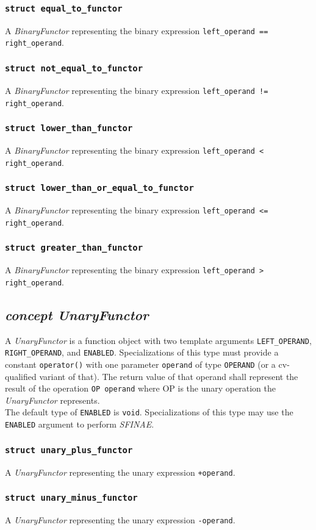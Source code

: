 \documentclass[oneside]{article}
\begin{document}
\subsubsection{\texttt{struct equal\_to\_functor}}
A \textit{BinaryFunctor} representing the binary expression \verb|left_operand == right_operand|.

\subsubsection{\texttt{struct not\_equal\_to\_functor}}
A \textit{BinaryFunctor} representing the binary expression \verb|left_operand != right_operand|.

\subsubsection{\texttt{struct lower\_than\_functor}}
A \textit{BinaryFunctor} representing the binary expression \verb|left_operand < right_operand|.

\subsubsection{\texttt{struct lower\_than\_or\_equal\_to\_functor}}
A \textit{BinaryFunctor} representing the binary expression \verb|left_operand <= right_operand|.

\subsubsection{\texttt{struct greater\_than\_functor}}
A \textit{BinaryFunctor} representing the binary expression \verb|left_operand > right_operand|.

\subsection{\textit{concept UnaryFunctor}}
A \textit{UnaryFunctor} is a function object with two template arguments \verb+LEFT_OPERAND+,
\verb+RIGHT_OPERAND+, and \verb+ENABLED+. Specializations of this type must provide a
constant \verb+operator()+ with one parameter \verb+operand+ of type \verb+OPERAND+
(or a cv-qualified variant of that). The return value of that operand shall represent the
result of the operation \verb+OP operand+ where OP is the unary operation
the \textit{UnaryFunctor} represents.\\

\noindent{}The default type of \verb+ENABLED+ is \verb+void+. Specializations of this type may use
the \verb+ENABLED+ argument to perform \textit{SFINAE}.

\subsubsection{\texttt{struct unary\_plus\_functor}}
A \textit{UnaryFunctor} representing the unary expression \verb|+operand|.

\subsubsection{\texttt{struct unary\_minus\_functor}}
A \textit{UnaryFunctor} representing the unary expression \verb|-operand|.
\end{document}

